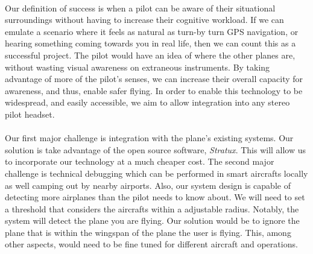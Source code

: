 \paragraph{}
Our definition of success is when a pilot can be aware of their situational surroundings without having to increase their cognitive workload. If we can emulate a scenario where it feels as natural as turn-by turn GPS navigation, or hearing something coming towards you in real life, then we can count this as a successful project. The pilot would have an idea of where the other planes are, without wasting visual awareness on extraneous instruments. By taking advantage of more of the pilot's senses, we can increase their overall capacity for awareness, and thus, enable safer flying. In order to enable this technology to be widespread, and easily accessible, we aim to allow integration into any stereo pilot headset. 


\paragraph{} 
Our  first major challenge  is integration with the plane’s existing systems. Our solution is take advantage of the open source software, \textit{Stratux}. This will allow us to incorporate our technology at a much cheaper cost. The second major challenge is technical debugging which can be performed in smart aircrafts locally as well camping out by nearby airports. Also, our system design is  capable of detecting more airplanes than the pilot needs to know about. We will need to set a threshold that considers the aircrafts within a adjustable radius. Notably, the system will detect the plane you are flying. Our solution would be to ignore the plane that is within the wingspan of the plane the user is flying. This, among other aspects, would need to be fine tuned for different aircraft and operations. 




